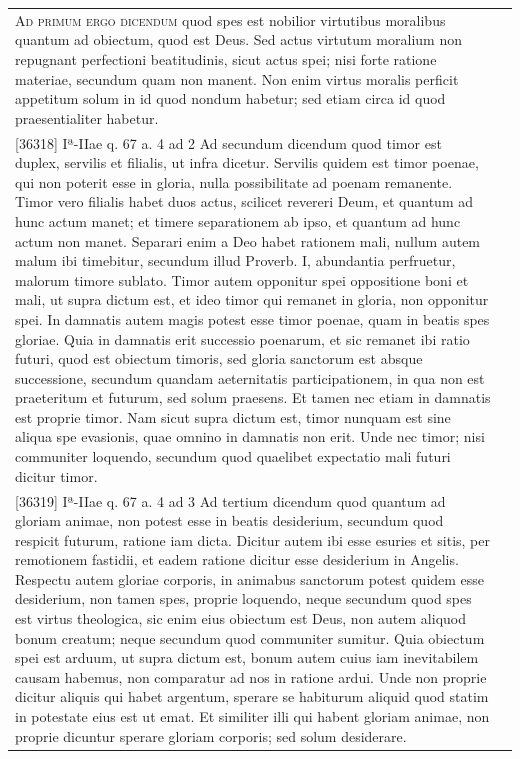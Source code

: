 \documentclass[paper=a4paper,fontsize=10pt,jafontsize=9pt,titlepage]{jlreq}
\begin{document}
\begin{longtable}{p{21em}p{21em}}
\\


 {\scshape Ad primum ergo dicendum} quod spes est nobilior virtutibus
 moralibus quantum ad obiectum, quod est Deus. Sed actus virtutum
 moralium non repugnant perfectioni beatitudinis, sicut actus spei;
 nisi forte ratione materiae, secundum quam non manent. Non enim
 virtus moralis perficit appetitum solum in id quod nondum habetur;
 sed etiam circa id quod praesentialiter habetur.
 
&

 

\\





[36318] Iª-IIae q. 67 a. 4 ad 2
 Ad secundum dicendum quod timor est duplex, servilis et filialis, ut infra dicetur. Servilis quidem est timor poenae, qui non poterit esse in gloria, nulla possibilitate ad poenam remanente. Timor vero filialis habet duos actus, scilicet revereri Deum, et quantum ad hunc actum manet; et timere separationem ab ipso, et quantum ad hunc actum non manet. Separari enim a Deo habet rationem mali, nullum autem malum ibi timebitur, secundum illud Proverb. I, abundantia perfruetur, malorum timore sublato. Timor autem opponitur spei oppositione boni et mali, ut supra dictum est, et ideo timor qui remanet in gloria, non opponitur spei. In damnatis autem magis potest esse timor poenae, quam in beatis spes gloriae. Quia in damnatis erit successio poenarum, et sic remanet ibi ratio futuri, quod est obiectum timoris, sed gloria sanctorum est absque successione, secundum quandam aeternitatis participationem, in qua non est praeteritum et futurum, sed solum praesens. Et tamen nec etiam in damnatis est proprie timor. Nam sicut supra dictum est, timor nunquam est sine aliqua spe evasionis, quae omnino in damnatis non erit. Unde nec timor; nisi communiter loquendo, secundum quod quaelibet expectatio mali futuri dicitur timor.

 
&


\\





[36319] Iª-IIae q. 67 a. 4 ad 3
 Ad tertium dicendum quod quantum ad gloriam animae, non potest esse in beatis desiderium, secundum quod respicit futurum, ratione iam dicta. Dicitur autem ibi esse esuries et sitis, per remotionem fastidii, et eadem ratione dicitur esse desiderium in Angelis. Respectu autem gloriae corporis, in animabus sanctorum potest quidem esse desiderium, non tamen spes, proprie loquendo, neque secundum quod spes est virtus theologica, sic enim eius obiectum est Deus, non autem aliquod bonum creatum; neque secundum quod communiter sumitur. Quia obiectum spei est arduum, ut supra dictum est, bonum autem cuius iam inevitabilem causam habemus, non comparatur ad nos in ratione ardui. Unde non proprie dicitur aliquis qui habet argentum, sperare se habiturum aliquid quod statim in potestate eius est ut emat. Et similiter illi qui habent gloriam animae, non proprie dicuntur sperare gloriam corporis; sed solum desiderare.

 
&



 
\end{longtable}
\newpage
\end{document}
